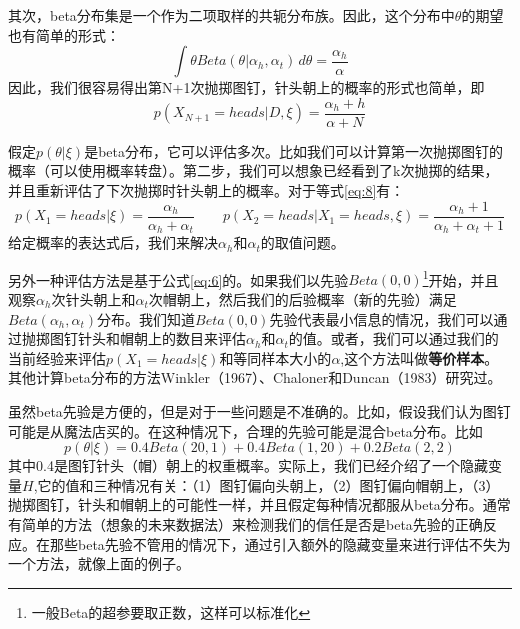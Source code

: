 \documentclass[10pt,a4paper]{article}
\begin{document}
\begin{CJK*}{UTF8}{gkai}
其次，beta分布集是一个作为二项取样的共轭分布族。因此，这个分布中$\theta$的期望也有简单的形式：
\begin{equation}
\int \theta Beta(\theta|\alpha_h,\alpha_t)\, d\theta = \frac{\alpha_h}{\alpha}
\end{equation}
因此，我们很容易得出第N+1次抛掷图钉，针头朝上的概率的形式也简单，即
\begin{equation}
\label{eq:8}
p(X_{N+1}=heads|D,\xi)=\frac{\alpha_h+h}{\alpha+N}
\end{equation}


假定$p(\theta|\xi)$是beta分布，它可以评估多次。比如我们可以计算第一次抛掷图钉的概率（可以使用概率转盘）。第二步，我们可以想象已经看到了k次抛掷的结果，并且重新评估了下次抛掷时针头朝上的概率。对于等式\ref{eq:8}有：
\begin{equation}
p(X_1=heads|\xi)=\frac{\alpha_h}{\alpha_h+\alpha_t} \qquad
p(X_2=heads|X_1=heads,\xi)=\frac{\alpha_h+1}{\alpha_h+\alpha_t+1} \nonumber
\end{equation}
给定概率的表达式后，我们来解决$\alpha_h$和$\alpha_t$的取值问题。


另外一种评估方法是基于公式\ref{eq:6}的。如果我们以先验$Beta(0,0)$\footnote{ 一般Beta的超参要取正数，这样可以标准化}开始，并且观察$\alpha_h$次针头朝上和$\alpha_t$次帽朝上，然后我们的后验概率（新的先验）满足$Beta(\alpha_h,\alpha_t)$分布。我们知道$Beta(0,0)$先验代表最小信息的情况，我们可以通过抛掷图钉针头和帽朝上的数目来评估$\alpha_h$和$\alpha_t$的值。或者，我们可以通过我们的当前经验来评估$p(X_1=heads|\xi)$和等同样本大小的$\alpha$,这个方法叫做\textbf{等价样本}。其他计算beta分布的方法Winkler（1967）、Chaloner和Duncan（1983）研究过。


虽然beta先验是方便的，但是对于一些问题是不准确的。比如，假设我们认为图钉可能是从魔法店买的。在这种情况下，合理的先验可能是混合beta分布。比如
\begin{equation}
p(\theta|\xi)=0.4 Beta(20,1) + 0.4 Beta(1,20) + 0.2 Beta(2,2) \nonumber
\end{equation}
其中0.4是图钉针头（帽）朝上的权重概率。实际上，我们已经介绍了一个隐藏变量$H$,它的值和三种情况有关：（1）图钉偏向头朝上，（2）图钉偏向帽朝上，（3）抛掷图钉，针头和帽朝上的可能性一样，并且假定每种情况都服从beta分布。通常有简单的方法（想象的未来数据法）来检测我们的信任是否是beta先验的正确反应。在那些beta先验不管用的情况下，通过引入额外的隐藏变量来进行评估不失为一个方法，就像上面的例子。



\end{CJK*}
\end{document}
